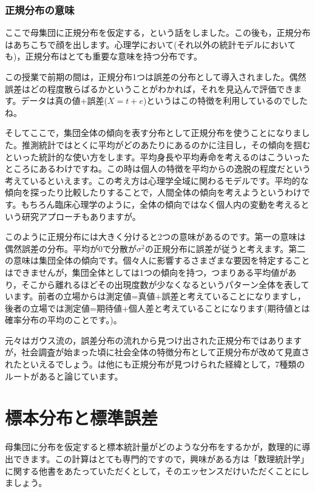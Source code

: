 \documentclass{ltjsbook}
\begin{document}
\subsubsection{正規分布の意味}
\label{SevenNormalDistributions}
ここで母集団に正規分布を仮定する，という話をしました。この後も，正規分布はあちこちで顔を出します。心理学において(それ以外の統計モデルにおいても)，正規分布はとても重要な意味を持つ分布です。

この授業で前期の間は，正規分布1つは誤差の分布として導入されました。偶然誤差はどの程度散らばるかということがわかれば，それを見込んで評価できます。データは真の値+誤差($X=t+e$)というはこの特徴を利用しているのでしたね。

そしてここで，集団全体の傾向を表す分布として正規分布を使うことになりました。推測統計ではとくに平均がどのあたりにあるのかに注目し，その傾向を掴むといった統計的な使い方をします。平均身長や平均寿命を考えるのはこういったところにあるわけですね。この時は個人の特徴を平均からの逸脱の程度だという考えているといえます。この考え方は心理学全域に関わるモデルです。平均的な傾向を探ったり比較したりすることで，人間全体の傾向を考えようというわけです。もちろん臨床心理学のように，全体の傾向ではなく個人内の変動を考えるという研究アプローチもありますが。

このように正規分布には大きく分けると2つの意味があるのです。第一の意味は偶然誤差の分布。平均が0で分散が$\sigma^2$の正規分布に誤差が従うと考えます。第二の意味は集団全体の傾向です。個々人に影響するさまざまな要因を特定することはできませんが，集団全体としては1つの傾向を持つ，つまりある平均値があり，そこから離れるほどその出現度数が少なくなるというパターン全体を表しています。前者の立場からは測定値=真値+誤差と考えていることになりますし，後者の立場では測定値=期待値+個人差と考えていることになります(期待値とは確率分布の平均のことです。)。

元々はガウス流の，誤差分布の流れから見つけ出された正規分布ではありますが，社会調査が始まった頃に社会全体の特徴分布として正規分布が改めて見直されたといえるでしょう。\textcite{Shiina2013}は他にも正規分布が見つけられた経緯として，7種類のルートがあると論じています。


\section{標本分布と標準誤差}
母集団に分布を仮定すると標本統計量がどのような分布をするかが，数理的に導出できます。この計算はとても専門的ですので，興味がある方は「数理統計学」に関する他書をあたっていただくとして，そのエッセンスだけいただくことにしましょう。
\end{document}
